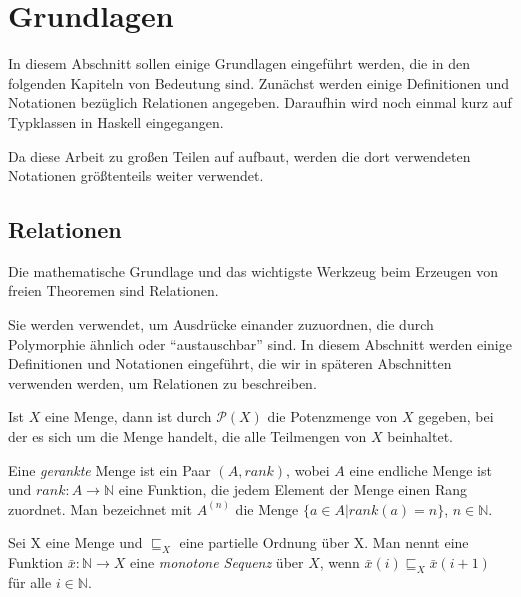 \section{Grundlagen}

In diesem Abschnitt sollen einige Grundlagen eingeführt werden, die in den folgenden Kapiteln von Bedeutung sind. Zunächst werden
einige Definitionen und Notationen bezüglich Relationen angegeben. Daraufhin wird noch einmal kurz auf Typklassen in Haskell
eingegangen.

Da diese Arbeit zu großen Teilen auf \cite{freetheorems} aufbaut, werden die dort verwendeten Notationen größtenteils
weiter verwendet.


\subsection{Relationen}

Die mathematische Grundlage und das wichtigste Werkzeug beim Erzeugen von freien Theoremen sind Relationen.

Sie werden verwendet, um Ausdrücke einander zuzuordnen, die durch Polymorphie ähnlich oder ``austauschbar'' sind.
In diesem Abschnitt werden einige Definitionen und Notationen eingeführt, die wir in späteren Abschnitten verwenden werden,
um Relationen zu beschreiben. 


Ist $X$ eine Menge, dann ist durch $\mathcal{P}(X)$ die Potenzmenge von $X$ gegeben, bei der es sich um die Menge handelt, die
alle Teilmengen von $X$ beinhaltet.

Eine \textit{gerankte} Menge  ist ein Paar $(A, rank)$, wobei $A$ eine endliche Menge ist und
$rank : A \rightarrow \mathbb{N}$ eine Funktion, die jedem Element der Menge einen Rang zuordnet. Man bezeichnet mit
$A^{(n)}$ die Menge $\{a \in A | rank(a) = n \}$, $n \in \mathbb{N}$.

Sei X eine Menge und $\sqsubseteq_{X}$ eine partielle Ordnung über X. Man nennt eine Funktion $\bar{x} : \mathbb{N} \rightarrow X$
eine \textit{monotone Sequenz} über $X$, wenn $\bar{x}(i) \sqsubseteq_{X} \bar{x}(i + 1)$ für alle $i \in \mathbb{N}$.

